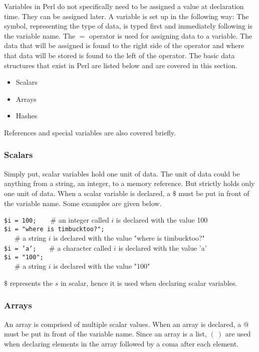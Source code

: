 \documentclass[11pt,a4paper]{article}
\begin{document}
\noindent Variables in Perl do not specifically need to be assigned a value at declaration time. They can be assigned later\cite{04}. A variable is set up in the following way: The symbol, representing the type of data, is typed first and immediately following is the variable name. The $=$ operator is used for assigning data to a variable. The data that will be assigned is found to the right side of the operator and where that data will be stored is found to the left of the operator.  The basic data structures that exist in Perl are listed below and are covered in this section.\begin{itemize}
                \item Scalars
                \item Arrays
                \item Hashes
                \end{itemize}
                References and special variables are also covered briefly.
                
\subsubsection{Scalars}
Simply put, scalar variables hold one unit of data. The unit of data could be anything from a string, an integer, to a memory reference. But strictly holds only one unit of data. When a scalar variable is declared, a $\$$ must be put in front of the variable name. Some examples are given below.
                
\begin{tabbing}
                \texttt{\$i = 100; }\ \ \ \# an integer called $i$ is declared with the value 100\\
                \texttt{\$i = "where\ is\ timbucktoo?";}\\\ \ \ \# a string $i$ is declared with the value "where is timbucktoo?"\\
                \texttt{\$i = 'a';} \ \ \ \# a character called $i$ is declared with the value 'a'\\
                \texttt{\$i = "100";}\\\ \ \ \# a string $i$ is declared with the value "100"\\
\end{tabbing}
                                
\noindent $\$$ represents the $s$ in scalar, hence it is used when declaring scalar variables.
                
\subsubsection{Arrays}
\noindent An array is comprised of multiple scalar values. When an array is declared, a $@$ must be put in front of the variable name. Since an array is a list, $(\ )$ are used when declaring elements in the array followed by a coma after each element.
                
\end{document}
